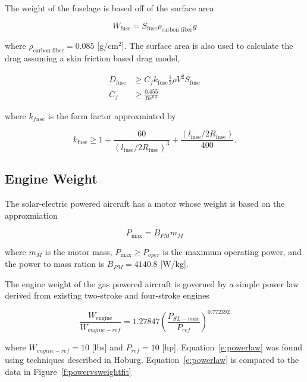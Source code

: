 \documentclass[]{aiaa-tc}%
\begin{document}
The weight of the fuselage is based off of the surface area

\begin{equation}
    \label{e:fuseweight}
    W_{\text{fuse}} = S_{\text{fuse}} \rho_{\text{carbon fiber}} g
\end{equation} 

where $\rho_{\text{carbon fiber}} = 0.085$ [g/cm$^2$].  The surface area is also used to calculate the drag assuming a skin friction based drag model,

\begin{align}
    \label{e:fusedrag}
    D_{\text{fuse}} &\geq C_f k_{\text{fuse}} \frac{1}{2} \rho V^2 S_{\text{fuse}} \\
    C_f &\geq \frac{0.455}{Re^{0.3}}
\end{align}

where $k_{fuse}$ is the form factor approxmiated by 

\begin{equation}
    \label{e:fuseform}
    k_{\text{fuse}} \geq 1 + \frac{60}{(l_{\text{fuse}}/2R_{\text{fuse}})^3} + \frac{(l_{\text{fuse}}/2R_{\text{fuse}})}{400}.
\end{equation}

\subsection{Engine Weight}

The solar-electric powered aircraft has a motor whose weight is based on the approxmiation\cite{electricengine}

\begin{equation}
    \label{e:electricengine}
    P_{\text{max}} = B_{PM} m_{M}
\end{equation}

where $m_M$ is the motor mass, $P_{\text{max}} \geq P_{oper}$ is the maximum operating power, and the power to mass ration is $B_{PM} = 4140.8$ [W/kg].

The engine weight of the gas powered aircraft is governed by a simple power law derived from existing two-stroke and four-stroke engines\cite{gasengine}

\begin{equation}
    \label{e:powerlaw}
    \frac{W_{\text{engine}}}{W_{engine-ref}} = 1.27847 \left(\frac{P_{SL-max}}{P_{ref}} \right)^{0.772392}
\end{equation}

where $W_{engine-ref} = 10$ [lbs] and $P_{ref} = 10$ [hp].  Equation~\eqref{e:powerlaw} was found using techniques described in Hoburg\cite{fitting}. Equation~\eqref{e:powerlaw} is compared to the data in Figure~\ref{f:powervsweightfit}
\end{document}
